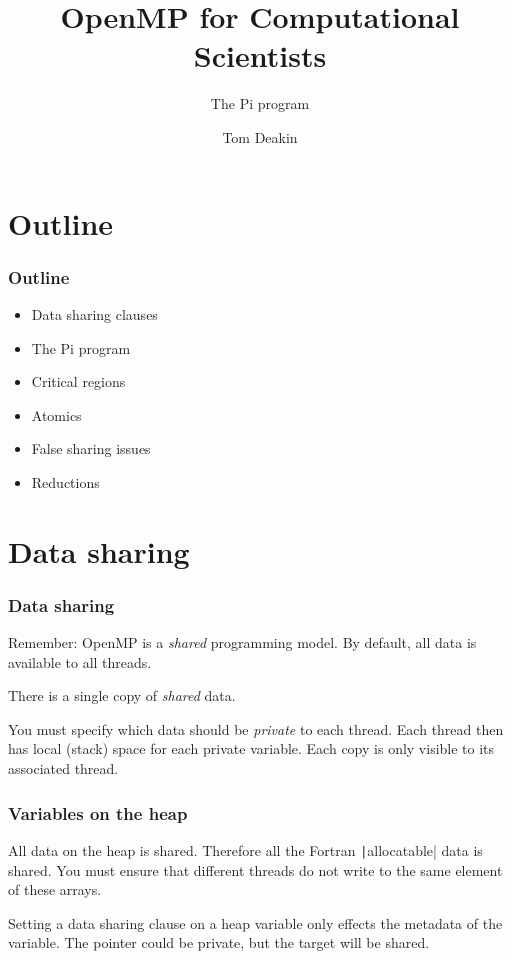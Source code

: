 \documentclass{beamer}
\author{Tom Deakin}
\title{OpenMP for Computational Scientists}
\subtitle{The Pi program}
\begin{document}
\frame{\titlepage}


\section{Outline}
\begin{frame}
\frametitle{Outline}
\begin{itemize}
  \item Data sharing clauses
  \item The Pi program
  \item Critical regions
  \item Atomics
  \item False sharing issues
  \item Reductions
\end{itemize}
\end{frame}

\section{Data sharing}
\begin{frame}
\frametitle{Data sharing}
Remember: OpenMP is a \emph{shared} programming model.
By default, all data is available to all threads.

There is a single copy of \emph{shared} data.

You must specify which data should be \emph{private} to each thread.
Each thread then has local (stack) space for each private variable.
Each copy is only visible to its associated thread.
\end{frame}


\begin{frame}
\frametitle{Variables on the heap}
All data on the heap is shared.
Therefore all the Fortran \texttt|allocatable| data is shared.
You must ensure that different threads do not write to the same element of these arrays.

Setting a data sharing clause on a heap variable only effects the metadata of the variable.
The pointer could be private, but the target will be shared.
\end{frame}
\end{document}
